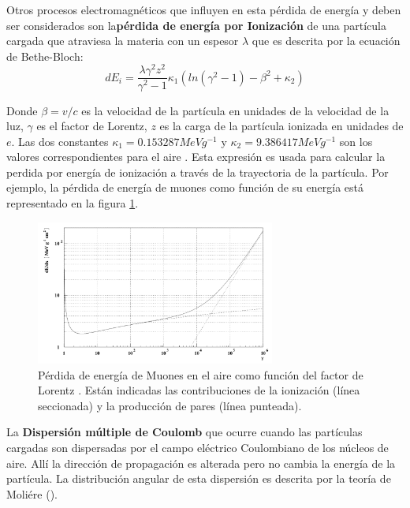 Otros procesos electromagnéticos que influyen en esta pérdida de energía y deben ser considerados son la\textbf{pérdida de energía por Ionización} de una partícula cargada que atraviesa la materia con un espesor $\lambda$ que es descrita por la ecuación de Bethe-Bloch:
\begin{equation}
dE_{i} = \frac{\lambda \gamma^{2}z^{2}}{\gamma^{2}-1}\kappa_{1}(ln(\gamma^{2}-1)- \beta^{2}+\kappa_{2})
\label{eq:eq20}
\end{equation}

Donde $\beta = v/c $ es la velocidad de la partícula en unidades de la velocidad de la luz, $\gamma$ es el factor de Lorentz, $z$ es la carga de la partícula ionizada en unidades de $e$. Las dos constantes $\kappa_{1}= 0.153287 MeV g^{-1}$ y $\kappa_{2}= 9.386417 MeV g^{-1}$ son los valores correspondientes para el aire \cite{Heck1998}. Esta expresión es usada para calcular la perdida por energía de ionización a través de la trayectoria de la partícula. Por ejemplo, la pérdida de energía de muones como función de su energía está representado en la figura \ref{fig:fig4}.\\

\begin{figure}[htb!]
\centering
        \includegraphics[width=0.7\textwidth]{Figs/Bethe_Muons.png}
        \caption[Ecuación de Bethe-Bloch para los muones.]{Pérdida de energía de Muones en el aire como función del factor de Lorentz \cite{Heck1998}. Están indicadas las contribuciones de la ionización (línea seccionada) y la producción de pares (línea punteada).}
        \label{fig:fig4}
\end{figure}

La \textbf{Dispersión múltiple de Coulomb} que ocurre cuando las partículas cargadas son dispersadas por el campo eléctrico Coulombiano de los núcleos de aire. Allí la dirección de propagación es alterada pero no cambia la energía de la partícula. La distribución angular de esta dispersión es descrita por la teoría de Moliére (\cite{Heck1998}).  

